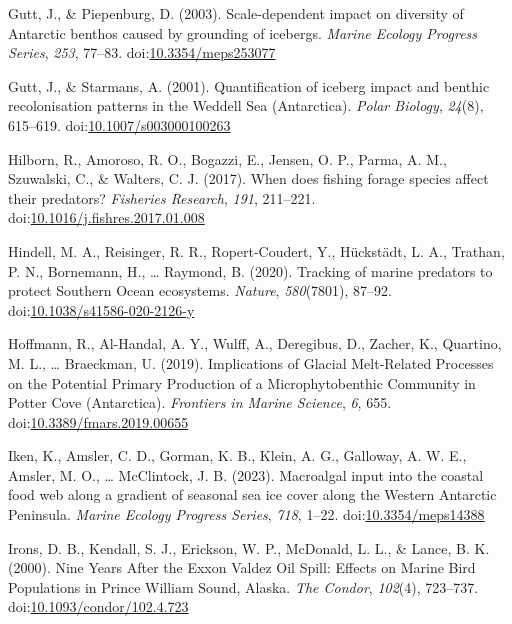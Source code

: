 \documentclass[
]{article}
\newlength{\cslhangindent}
\newlength{\cslentryspacingunit} %
\newenvironment{CSLReferences}[2] %
 {%
  \setlength{\parindent}{0pt}
  \ifodd #1
  \let\oldpar\par
  \def\par{\hangindent=\cslhangindent\oldpar}
  \fi
  \setlength{\parskip}{#2\cslentryspacingunit}
 }%
 {}
\begin{document}
\begin{CSLReferences}{1}{0}
\leavevmode{}%
Gutt, J., \& Piepenburg, D. (2003). Scale-dependent impact on diversity
of {Antarctic} benthos caused by grounding of icebergs. \emph{Marine
Ecology Progress Series}, \emph{253}, 77--83.
doi:\href{https://doi.org/10.3354/meps253077}{10.3354/meps253077}

\leavevmode{}%
Gutt, J., \& Starmans, A. (2001). Quantification of iceberg impact and
benthic recolonisation patterns in the {Weddell Sea} ({Antarctica}).
\emph{Polar Biology}, \emph{24}(8), 615--619.
doi:\href{https://doi.org/10.1007/s003000100263}{10.1007/s003000100263}

\leavevmode{}%
Hilborn, R., Amoroso, R. O., Bogazzi, E., Jensen, O. P., Parma, A. M.,
Szuwalski, C., \& Walters, C. J. (2017). When does fishing forage
species affect their predators? \emph{Fisheries Research}, \emph{191},
211--221.
doi:\href{https://doi.org/10.1016/j.fishres.2017.01.008}{10.1016/j.fishres.2017.01.008}

\leavevmode{}%
Hindell, M. A., Reisinger, R. R., Ropert-Coudert, Y., Hückstädt, L. A.,
Trathan, P. N., Bornemann, H., \ldots{} Raymond, B. (2020). Tracking of
marine predators to protect {Southern Ocean} ecosystems. \emph{Nature},
\emph{580}(7801), 87--92.
doi:\href{https://doi.org/10.1038/s41586-020-2126-y}{10.1038/s41586-020-2126-y}

\leavevmode{}%
Hoffmann, R., Al-Handal, A. Y., Wulff, A., Deregibus, D., Zacher, K.,
Quartino, M. L., \ldots{} Braeckman, U. (2019). Implications of {Glacial
Melt-Related Processes} on the {Potential Primary Production} of a
{Microphytobenthic Community} in {Potter Cove} ({Antarctica}).
\emph{Frontiers in Marine Science}, \emph{6}, 655.
doi:\href{https://doi.org/10.3389/fmars.2019.00655}{10.3389/fmars.2019.00655}

\leavevmode{}%
Iken, K., Amsler, C. D., Gorman, K. B., Klein, A. G., Galloway, A. W.
E., Amsler, M. O., \ldots{} McClintock, J. B. (2023). Macroalgal input
into the coastal food web along a gradient of seasonal sea ice cover
along the {Western Antarctic Peninsula}. \emph{Marine Ecology Progress
Series}, \emph{718}, 1--22.
doi:\href{https://doi.org/10.3354/meps14388}{10.3354/meps14388}

\leavevmode{}%
Irons, D. B., Kendall, S. J., Erickson, W. P., McDonald, L. L., \&
Lance, B. K. (2000). Nine {Years After} the {Exxon Valdez Oil Spill}:
{Effects} on {Marine Bird Populations} in {Prince William Sound},
{Alaska}. \emph{The Condor}, \emph{102}(4), 723--737.
doi:\href{https://doi.org/10.1093/condor/102.4.723}{10.1093/condor/102.4.723}


\end{CSLReferences}
\end{document}
